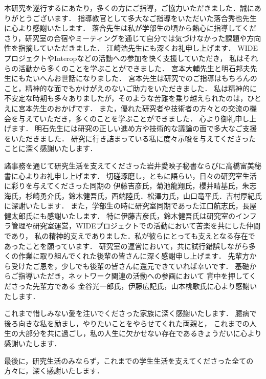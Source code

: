 本研究を遂行するにあたり，多くの方にご指導，ご協力いただきました．誠にありがとうございます．
指導教官として多大なご指導をいただいた落合秀也先生に心より感謝いたします．
落合先生は私が学部生の頃から熱心に指導してくださり，研究室の合宿やミーティングを通じて自分では気づけなかった課題や方向性を指摘していただきました．
江崎浩先生にも深くお礼申し上げます．
WIDEプロジェクトやInteropなどの活動への参加を快く支援していただき，
私はそれらの活動から多くのことを学ぶことができました．
宮本大輔先生と明石邦夫先生にもたいへんお世話になりました．
宮本先生は研究でのご指導はもちろんのこと，精神的な面でもかけがえのないご助力をいただきました．
私は精神的に不安定な時期も多々ありましたが，そのような苦難を乗り越えられたのは，ひとえに宮本先生のおかげです．
また，優れた研究者や技術者の方々との交流の機会を与えていただき，多くのことを学ぶことができました．
心より御礼申し上げます．
明石先生には研究の正しい進め方や技術的な議論の面で多大なご支援をいただきました．
研究に行き詰まっている私に度々示唆を与えてくださったことに深く感謝いたします．

諸事務を通じて研究生活を支えてくださった岩井愛映子秘書ならびに高橋富美秘書に心よりお礼申し上げます．
切磋琢磨し，ともに語らい，日々の研究室生活に彩りを与えてくださった同期の
伊藤吉彦氏，菊池龍翔氏，櫻井晴基氏，朱志海氏，杉崎勇介氏，鈴木健吾氏，西端陸氏．松澤力氏，山口竜平氏．吉村厚紀氏
に深謝いたします．
また，学部生の時に研究室同期であった江口航志氏，長屋健太郎氏にも感謝いたします．
特に伊藤吉彦氏，鈴木健吾氏は研究室のインフラ管理や研究室運営，WIDEプロジェクトでの活動において苦楽を共にした仲間であり，
私の精神的支えでありました．私が彼らにとっても支えとなる存在であったことを願っています．
研究室の運営において，共に試行錯誤しながら多くの作業に取り組んでくれた後輩の皆さんに深く感謝申し上げます．
先輩方から受けたご恩を，少しでも後輩の皆さんに還元できていれば幸いです．
基礎からご指導いただき，ネットワーク関連の活動への参画において
背中を押してくださった先輩方である
金谷光一郎氏，伊藤広記氏，山本桃歌氏に心より感謝いたします．

これまで惜しみない愛を注いでくださった家族に深く感謝いたします．
臆病で後ろ向きな私を励まし，やりたいことをやらせてくれた両親と，
これまでの人生の大部分を共に過ごし，私の人生に欠かせない存在であるきょうだいに心より感謝いたします．

最後に，研究生活のみならず，これまでの学生生活を支えてくださった全ての方々に，深く感謝いたします．
